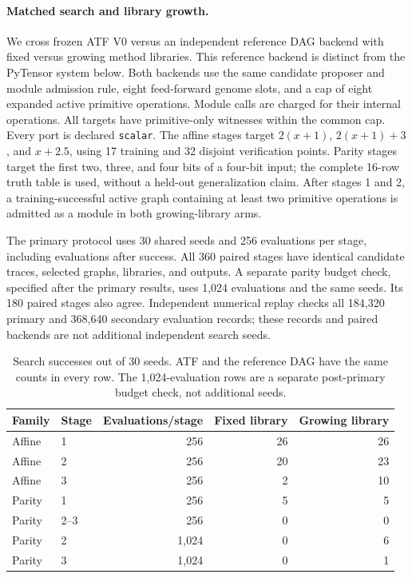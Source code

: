 \paragraph{Matched search and library growth.}
We cross frozen ATF V0 versus an independent reference DAG backend with fixed
versus growing method libraries. This reference backend is distinct from the
PyTensor system below. Both backends use the same candidate proposer and module
admission rule, eight feed-forward genome slots, and a cap of eight expanded
active primitive operations. Module calls are charged for their internal
operations. All targets have primitive-only witnesses within the common cap.
Every port is declared \texttt{scalar}. The affine stages target $2(x+1)$,
$2(x+1)+3$, and $x+2.5$, using 17 training and 32 disjoint verification points.
Parity stages target the first two, three, and four bits of a four-bit input;
the complete 16-row truth table is used, without a held-out generalization claim.
After stages 1 and 2, a training-successful active graph containing at least two
primitive operations is admitted as a module in both growing-library arms.

The primary protocol uses 30 shared seeds and 256 evaluations per stage,
including evaluations after success. All 360 paired stages have identical
candidate traces, selected graphs, libraries, and outputs. A separate parity
budget check, specified after the primary results, uses 1,024 evaluations and
the same seeds. Its 180 paired stages also agree. Independent numerical replay
checks all 184,320 primary and 368,640 secondary evaluation records; these
records and paired backends are not additional independent search seeds.

\begin{table}[H]
\centering
\small
\caption{Search successes out of 30 seeds. ATF and the reference DAG have the
same counts in every row. The 1,024-evaluation rows are a separate post-primary
budget check, not additional seeds.}
\label{tab:typed_dag_search_control}
\begin{tabular}{llrrr}
\toprule
Family & Stage & Evaluations/stage & Fixed library & Growing library \\
\midrule
Affine & 1 & 256 & 26 & 26 \\
Affine & 2 & 256 & 20 & 23 \\
Affine & 3 & 256 & 2 & 10 \\
Parity & 1 & 256 & 5 & 5 \\
Parity & 2--3 & 256 & 0 & 0 \\
Parity & 2 & 1,024 & 0 & 6 \\
Parity & 3 & 1,024 & 0 & 1 \\
\bottomrule
\end{tabular}
\end{table}

